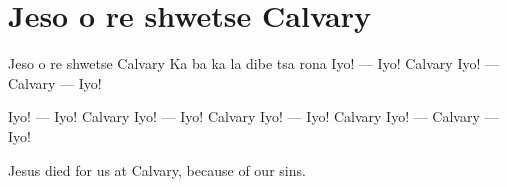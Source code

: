 \starttocol
\chapter{Jeso o re shwetse Calvary}
\nexttocol
\hfill{\it }
\stoptocol
\starttocol
\startlines
{\sc Jeso} o re shwetse Calvary
Ka ba ka la dibe tsa rona
Iyo! --- Iyo! Calvary
Iyo! --- Calvary --- Iyo!

Iyo! --- Iyo! Calvary
Iyo! --- Iyo! Calvary
Iyo! --- Iyo! Calvary
Iyo! --- Calvary --- Iyo!

\stoplines
\nexttocol
Jesus died for us at Calvary, because of our sins.
\stoptocol
